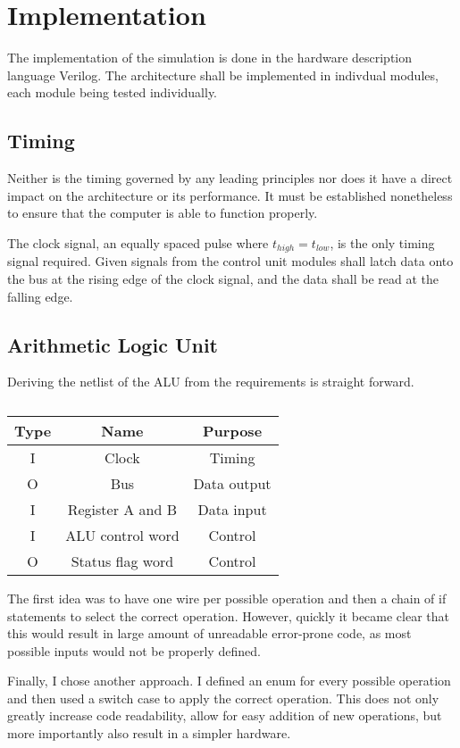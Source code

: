 \section{Implementation}



The implementation of the simulation is done in the hardware description language Verilog. The architecture shall be implemented in indivdual modules, each module being tested individually.    
\subsection{Timing}
Neither is the timing governed by any leading principles nor does it have a direct impact on the architecture or its performance. It must be established nonetheless to ensure that the computer is able to function properly.

The clock signal, an equally spaced pulse where $t_{high} = t_{low}$, is the only timing signal required. Given signals from the control unit modules shall latch data onto the bus at the rising edge of the clock signal, and the data shall be read at the falling edge.

\subsection{Arithmetic Logic Unit}
Deriving the netlist of the ALU from the requirements is straight forward.

\begin{table}[H]
\begin{tabular}{ccc}
Type& Name & Purpose \\ \hline
I   & Clock & Timing \\
O   & Bus     & Data output         \\
I   & Register A and B & Data input \\
I   & ALU control word & Control \\
O   & Status flag word & Control
\end{tabular}
\caption{}
\label{tab:alu-i/o}
\end{table}

The first idea was to have one wire per possible operation and then a chain of if statements to select the correct operation. However, quickly it became clear that this would result in large amount of unreadable error-prone code, as most possible inputs would not be properly defined.

Finally, I chose another approach. I defined an enum for every possible operation and then used a switch case to apply the correct operation. This does not only greatly increase code readability, allow for easy addition of new operations, but more importantly also result in a simpler hardware. 

